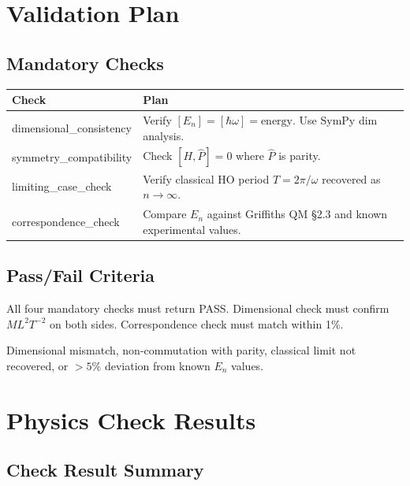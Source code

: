\documentclass[11pt,a4paper]{article}
\begin{document}
\section{Validation Plan}

\subsection{Mandatory Checks}

\begin{longtable}{>{\raggedright}p{4cm} p{8cm}}
\toprule
\textbf{Check} & \textbf{Plan} \\
\midrule
\endhead
dimensional\_consistency & Verify $[E_n] = [\hbar\omega] = \text{energy}$. Use SymPy dim analysis. \\
symmetry\_compatibility  & Check $[H, \hat{P}] = 0$ where $\hat{P}$ is parity. \\
limiting\_case\_check    & Verify classical HO period $T = 2\pi/\omega$ recovered as $n \to \infty$. \\
correspondence\_check    & Compare $E_n$ against Griffiths QM \S2.3 and known experimental values. \\
\bottomrule
\end{longtable}

\subsection{Pass/Fail Criteria}

\begin{infobox}
All four mandatory checks must return PASS. Dimensional check must confirm
$ML^2T^{-2}$ on both sides. Correspondence check must match within 1\%.
\end{infobox}

\begin{failbox}
Dimensional mismatch, non-commutation with parity, classical limit not
recovered, or $>5\%$ deviation from known $E_n$ values.
\end{failbox}

\section{Physics Check Results}

\subsection{Check Result Summary}
\end{document}

